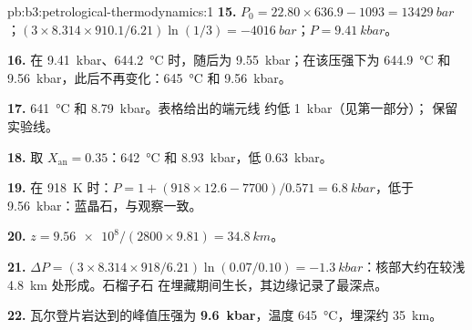 \begin{solution}{pb:b3:petrological-thermodynamics:1}
\textbf{15.} $P_0 = 22.80\times636.9 - 1093 = \qty{13429}{bar}$；$(3\times8.314
\times910.1/6.21)\ln(1/3) = \qty{-4016}{bar}$；$P = \qty{9.41}{kbar}$。

\textbf{16.} 在 \qty{9.41}{kbar}、\qty{644.2}{\celsius} 时，随后为
\qty{9.55}{kbar}；在该压强下为 \qty{644.9}{\celsius} 和
\qty{9.56}{kbar}，此后不再变化：\qty{645}{\celsius} 和
\qty{9.56}{kbar}。

\textbf{17.} \qty{641}{\celsius} 和 \qty{8.79}{kbar}。表格给出的端元线
约低 \qty{1}{kbar}（见第一部分）；
保留实验线。

\textbf{18.} 取 $X_{\text{an}} = 0.35$：\qty{642}{\celsius} 和
\qty{8.93}{kbar}，低 \qty{0.63}{kbar}。

\textbf{19.} 在 \qty{918}{K} 时：$P = 1 + (918\times12.6 - 7700)/0.571 =
\qty{6.8}{kbar}$，低于 \qty{9.56}{kbar}：蓝晶石，与观察一致。

\textbf{20.} $z = \num{9.56e8}/(2800\times9.81) = \qty{34.8}{km}$。

\textbf{21.} $\Delta P = (3\times8.314\times918/6.21)\ln(0.07/0.10) =
\qty{-1.3}{kbar}$：核部大约在较浅 \qty{4.8}{km} 处形成。石榴子石
在埋藏期间生长，其边缘记录了最深点。

\textbf{22.} 瓦尔登片岩达到的峰值压强为
\textbf{\qty[text-series-to-math=true]{9.6}{kbar}}，温度
\qty{645}{\celsius}，埋深约 \qty{35}{km}。
\end{solution}
